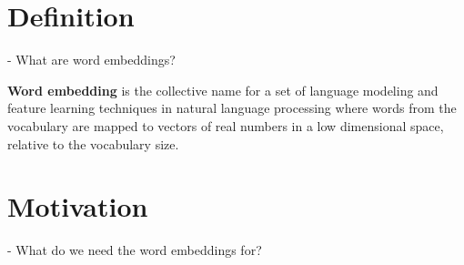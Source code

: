 \documentclass{beamer}
\begin{document}
    \section{Definition}
    \begin{frame}{\insertsubsection}
      - What are word embeddings?
      \begin{definition}
        \textbf{Word embedding} is the collective name for a set of
        language modeling and feature learning techniques in natural
        language processing where words from the vocabulary are mapped
        to vectors of real numbers in a low dimensional space,
        relative to the vocabulary size.
      \end{definition}
    \end{frame}


    \section{Motivation}
    \begin{frame}{\insertsection}
      - What do we need the word embeddings for?
      \begin{example}
      \end{example}

      \begin{example}
      \end{example}

    \end{frame}
\end{document}
